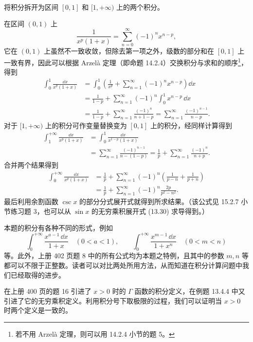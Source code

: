 \begin{xproof}
将积分拆开为区间 $[0,1]$ 和 $[1,+\infty)$ 上的两个积分。

在区间 $(0,1)$ 上
\[
  \frac1{x^p(1+x)}=\sum_{n=0}^{\infty}(-1)^n x^{n-p},
\]
它在 $(0,1)$ 上虽然不一致收敛，但除去第一项之外，级数的部分和在 $[0,1]$ 上一致有界，因此可以根据 Arzelà 定理（即命题 14.2.4）交换积分与求和的顺序\footnote{若不用 Arzelà 定理，则可以用 14.2.4 小节的题 5。}，得到
\[
\begin{aligned}
  \int_0^1\frac{\dd x}{x^p(1+x)}
  &=\int_0^1\left(\frac1{x^p}+\sum_{n=1}^{\infty}(-1)^n x^{n-p}\right)\dd x\\
  &=\frac1{1-p}+\sum_{n=1}^{\infty}(-1)^n\int_0^1x^{n-p}\,\dd x\\
  &=\frac1{1-p}+\sum_{n=1}^{\infty}\frac{(-1)^n}{n+1-p}
  =\sum_{n=1}^{\infty}\frac{(-1)^{n-1}}{n-p}.
\end{aligned}
\]
对于 $[1,+\infty)$ 上的积分可作变量替换变为 $[0,1]$ 上的积分，经同样计算得到
\[
\begin{aligned}
  \int_1^{+\infty}\frac{\dd x}{x^p(1+x)}
  &=\int_0^1\frac{\dd x}{x^{1-p}(1+x)}\\
  &=\sum_{n=1}^{\infty}\frac{(-1)^{n-1}}{n-(1-p)}
  =\frac1p+\sum_{n=1}^{\infty}\frac{(-1)^n}{n+p}.
\end{aligned}
\]
合并两个结果得到
\[
\begin{aligned}
  \int_0^{+\infty}\frac{\dd x}{x^p(1+x)}
  &=\frac1p+\sum_{n=1}^{\infty}(-1)^n\left(\frac1{p-n}+\frac1{p+n}\right)\\
  &=\frac1p+\sum_{n=1}^{\infty}(-1)^n\frac{2p}{p^2-n^2}.
\end{aligned}
\]
最后利用余割函数 $\csc x$ 的部分分式展开式就得到所求结果。（该公式见 15.2.7 小节练习题 3，也可以从 $\sin x$ 的无穷乘积展开式 (13.30) 求导得到。）
\end{xproof}

\begin{xremark}
本题的积分有各种不同的形式，例如
\[
  \int_0^{+\infty}\frac{x^{a-1}\,\dd x}{1+x}\quad(0<a<1),\qquad
  \int_0^{+\infty}\frac{x^{m-1}\,\dd x}{1+x^n}\quad(0<m<n)
\]
等。此外，上册 402 页题 8 中的所有公式均为本题之特例，且其中的参数 $m,n$ 等都可以不限于正整数。读者可以对比两处所用方法，从而知道在积分计算问题中我们已经取得的进步。
\end{xremark}

在上册 400 页的题 16 引进了 $x>0$ 时的 $\Gamma$ 函数的积分定义，在例题 13.4.4 中又引进了它的无穷乘积定义。利用积分号下取极限的过程，我们可以证明当 $x>0$ 时两个定义是一致的。

